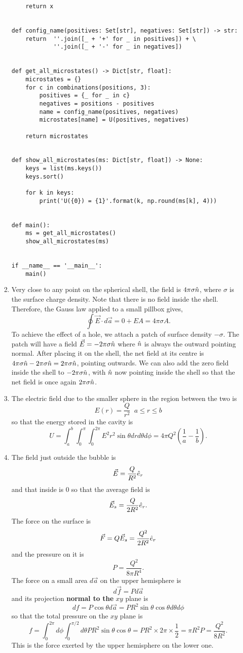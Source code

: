\documentclass{article}
\begin{document}
\begin{enumerate}
\begin{verbatim}
    return x


def config_name(positives: Set[str], negatives: Set[str]) -> str:
    return  ''.join([_ + '+' for _ in positives]) + \
            ''.join([_ + '-' for _ in negatives])


def get_all_microstates() -> Dict[str, float]:
    microstates = {}
    for c in combinations(positions, 3):
        positives = {_ for _ in c}
        negatives = positions - positives    
        name = config_name(positives, negatives)
        microstates[name] = U(positives, negatives)

    return microstates


def show_all_microstates(ms: Dict[str, float]) -> None:
    keys = list(ms.keys())
    keys.sort()

    for k in keys:
        print('U({0}) = {1}'.format(k, np.round(ms[k], 4)))


def main():
    ms = get_all_microstates()
    show_all_microstates(ms)


if __name__ == '__main__':
    main()    
\end{verbatim}

\item Very close to any point on the spherical shell, the field is $4\pi\sigma\hat{n}$,
where $\sigma$ is the surface charge density. Note that there is no field inside
the shell. Therefore, the Gauss law applied to a small pillbox gives,
\[
\oint\vec{E}\cdot d\vec{a} = 0 + EA = 4\pi\sigma A.
\]
To achieve the effect of a hole, we attach a patch of surface density $-\sigma$.
The patch will have a field $\vec{E} = -2\pi\sigma\hat{n}$ where $\hat{n}$ is always the
outward pointing normal. After placing it on the shell, the net field at its 
centre is $4\pi\sigma\hat{n} - 2\pi\sigma\hat{n} = 2\pi\sigma\hat{n}$, pointing outwards.
We can also add the zero field inside the shell to $-2\pi\sigma\hat{n}$, with $\hat{n}$
now pointing inside the shell so that the net field is once again $2\pi\sigma\hat{n}$.

\item The electric field due to the smaller sphere in the region between the
two is
\[
E(r) = \frac{Q}{r^2} \;\; a \le r \le b
\]
so that the energy stored in the cavity is
\[
U = \int_a^b\int_0^\pi\int_0^{2\pi} E^2 r^2\sin\theta drd\theta d\phi =
4\pi Q^2\left(\frac{1}{a} - \frac{1}{b}\right).
\]

\item The field just outside the bubble is
\[
\vec{E} = \frac{Q}{R^2}\hat{e}_{r}
\]
and that inside is $0$ so that the average field is
\[
\vec{E}_s = \frac{Q}{2R^2}\hat{e}_{r}.
\]
The force on the surface is 
\[
\vec{F} = Q\vec{E}_s = \frac{Q^2}{2R^2}\hat{e}_{r}
\]
and the pressure on it is 
\[
P = \frac{Q^2}{8\pi R^4}.
\]
The force on a small area $d\vec{a}$ on the upper hemisphere is 
\[
d\vec{f} = Pd\vec{a}
\]
and its projection \textbf{normal to the} $xy$ plane is 
\[
df = P\cos\theta d\vec{a} = PR^2\sin\theta\cos\theta d\theta d\phi
\]
so that the total pressure on the $xy$ plane is
\[
f = \int_0^{2\pi} d\phi \int_0^{\pi/2} d\theta PR^2\sin\theta\cos\theta =
PR^2 \times 2\pi \times \frac{1}{2} = \pi R^2 P = \frac{Q^2}{8R^2}.
\]
This is the force exerted by the upper hemisphere on the lower one.


\end{enumerate}
\end{document}
